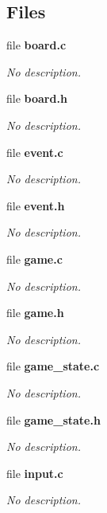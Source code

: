 \subsection*{Files}
\begin{DoxyCompactItemize}
\item 
file \textbf{ board.\+c}
\begin{DoxyCompactList}\small\item\em No description. \end{DoxyCompactList}\item 
file \textbf{ board.\+h}
\begin{DoxyCompactList}\small\item\em No description. \end{DoxyCompactList}\item 
file \textbf{ event.\+c}
\begin{DoxyCompactList}\small\item\em No description. \end{DoxyCompactList}\item 
file \textbf{ event.\+h}
\begin{DoxyCompactList}\small\item\em No description. \end{DoxyCompactList}\item 
file \textbf{ game.\+c}
\begin{DoxyCompactList}\small\item\em No description. \end{DoxyCompactList}\item 
file \textbf{ game.\+h}
\begin{DoxyCompactList}\small\item\em No description. \end{DoxyCompactList}\item 
file \textbf{ game\+\_\+state.\+c}
\begin{DoxyCompactList}\small\item\em No description. \end{DoxyCompactList}\item 
file \textbf{ game\+\_\+state.\+h}
\begin{DoxyCompactList}\small\item\em No description. \end{DoxyCompactList}\item 
file \textbf{ input.\+c}
\begin{DoxyCompactList}\small\item\em No description. \end{DoxyCompactList}\item 

\end{DoxyCompactItemize}
